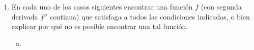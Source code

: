 \begin{enumerate}[\bfseries 1.]
    \item En cada uno de los casos siguientes encontrar una función $f$ (con segunda derivada $f''$ continua) que satisfaga a todos las condiciones indicadas, o bien explicar por qué no es posible encontrar una tal función.
	\begin{enumerate}[(a)]

	    \item 

	\end{enumerate}


	
\end{enumerate}

